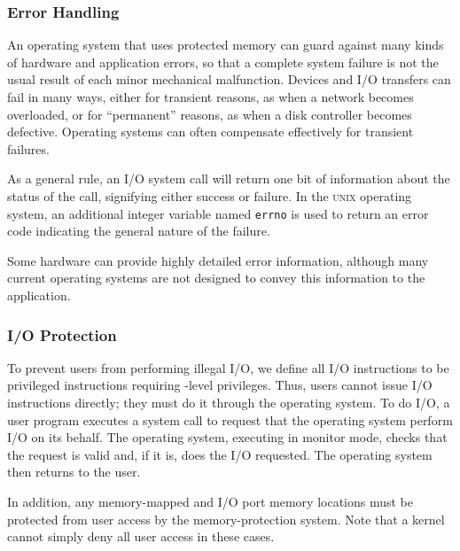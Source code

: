 \subsubsection{Error Handling}\label{subsubsec:IO_Error_Handling}
An operating system that uses protected memory can guard against many kinds of hardware and application errors, so that a complete system failure is not the usual result of each minor mechanical malfunction.
Devices and I/O transfers can fail in many ways, either for transient reasons, as when a network becomes overloaded, or for ``permanent'' reasons, as when a disk controller becomes defective.
Operating systems can often compensate effectively for transient failures.

As a general rule, an I/O system call will return one bit of information about the status of the call, signifying either success or failure.
In the \textsc{unix} operating system, an additional integer variable named \texttt{errno} is used to return an error code indicating the general nature of the failure.

Some hardware can provide highly detailed error information, although many current operating systems are not designed to convey this information to the application.

\subsubsection{I/O Protection}\label{subsubsec:IO_Protection}
To prevent users from performing illegal I/O, we define all I/O instructions to be privileged instructions requiring -level privileges.
Thus, users cannot issue I/O instructions directly; they must do it through the operating system.
To do I/O, a user program executes a system call to request that the operating system perform I/O on its behalf.
The operating system, executing in monitor mode, checks that the request is valid and, if it is, does the I/O requested.
The operating system then returns to the user.

In addition, any memory-mapped and I/O port memory locations must be protected from user access by the memory-protection system.
Note that a kernel cannot simply deny all user access in these cases.



